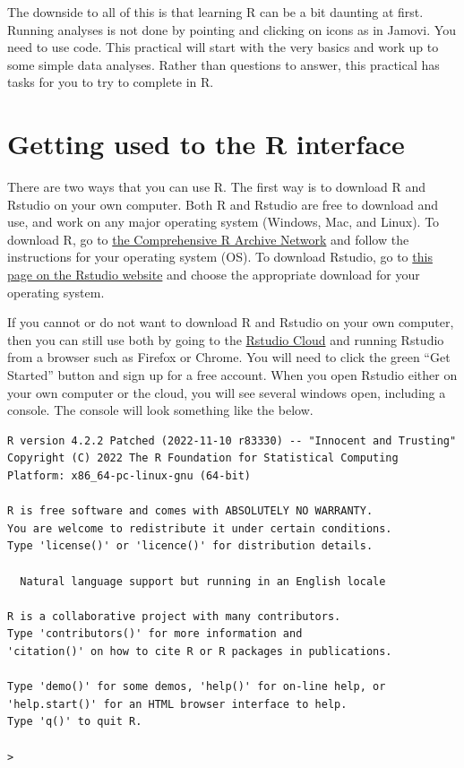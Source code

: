 \documentclass[
]{scrbook}
\begin{document}
The downside to all of this is that learning R can be a bit daunting at first.
Running analyses is not done by pointing and clicking on icons as in Jamovi.
You need to use code.
This practical will start with the very basics and work up to some simple data analyses.
Rather than questions to answer, this practical has tasks for you to try to complete in R.

\hypertarget{getting-used-to-the-r-interface}{%
\section{Getting used to the R interface}\label{getting-used-to-the-r-interface}}

There are two ways that you can use R.
The first way is to download R and Rstudio on your own computer.
Both R and Rstudio are free to download and use, and work on any major operating system (Windows, Mac, and Linux).
To download R, go to \href{https://cran.rstudio.com/}{the Comprehensive R Archive Network} and follow the instructions for your operating system (OS).
To download Rstudio, go to \href{https://posit.co/download/rstudio-desktop/\#download}{this page on the Rstudio website} and choose the appropriate download for your operating system.

If you cannot or do not want to download R and Rstudio on your own computer, then you can still use both by going to the \href{https://rstudio.cloud/}{Rstudio Cloud} and running Rstudio from a browser such as Firefox or Chrome.
You will need to click the green ``Get Started'' button and sign up for a free account.
When you open Rstudio either on your own computer or the cloud, you will see several windows open, including a console.
The console will look something like the below.

\begin{verbatim}
R version 4.2.2 Patched (2022-11-10 r83330) -- "Innocent and Trusting"
Copyright (C) 2022 The R Foundation for Statistical Computing
Platform: x86_64-pc-linux-gnu (64-bit)

R is free software and comes with ABSOLUTELY NO WARRANTY.
You are welcome to redistribute it under certain conditions.
Type 'license()' or 'licence()' for distribution details.

  Natural language support but running in an English locale

R is a collaborative project with many contributors.
Type 'contributors()' for more information and
'citation()' on how to cite R or R packages in publications.

Type 'demo()' for some demos, 'help()' for on-line help, or
'help.start()' for an HTML browser interface to help.
Type 'q()' to quit R.

> 
\end{verbatim}
\end{document}
